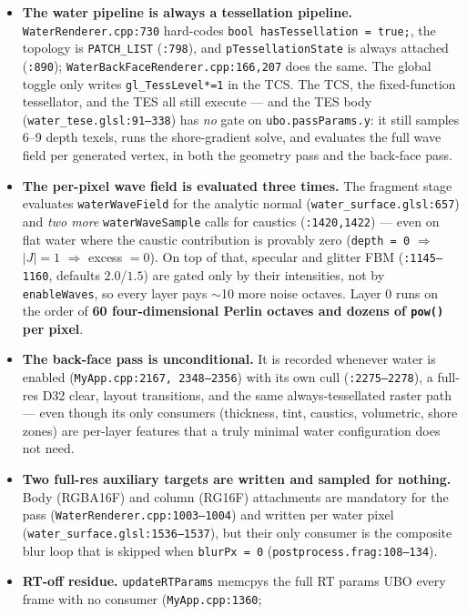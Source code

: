 \documentclass[11pt,a4paper]{article}
\begin{document}
\begin{itemize}
    \item \textbf{The water pipeline is always a tessellation pipeline.} \texttt{WaterRenderer.cpp:730} hard-codes \texttt{bool hasTessellation = true;}, the topology is
    \texttt{PATCH\_LIST} (\texttt{:798}), and \texttt{pTessellationState} is always attached (\texttt{:890}); \texttt{WaterBackFaceRenderer.cpp:166,207} does the same. The global
    toggle only writes \texttt{gl\_TessLevel*=1} in the TCS. The TCS, the fixed-function tessellator, and the TES all still execute --- and the TES body
    (\texttt{water\_tese.glsl:91--338}) has \emph{no} gate on \texttt{ubo.passParams.y}: it still samples 6--9 depth texels, runs the shore-gradient solve, and evaluates the full
    wave field per generated vertex, in both the geometry pass and the back-face pass.
    \item \textbf{The per-pixel wave field is evaluated three times.} The fragment stage evaluates \texttt{waterWaveField} for the analytic normal
    (\texttt{water\_surface.glsl:657}) and \emph{two more} \texttt{waterWaveSample} calls for caustics (\texttt{:1420,1422}) --- even on flat water where the caustic contribution is
    provably zero (\texttt{depth = 0} $\Rightarrow$ $|J| = 1$ $\Rightarrow$ excess $= 0$). On top of that, specular and glitter FBM (\texttt{:1145--1160}, defaults $2.0$/$1.5$) are gated
    only by their intensities, not by \texttt{enableWaves}, so every layer pays $\sim$10 more noise octaves. Layer 0 runs on the order of \textbf{60 four-dimensional Perlin
    octaves and dozens of \texttt{pow()} per pixel}.
    \item \textbf{The back-face pass is unconditional.} It is recorded whenever water is enabled (\texttt{MyApp.cpp:2167, 2348--2356}) with its own cull
    (\texttt{:2275--2278}), a full-res D32 clear, layout transitions, and the same always-tessellated raster path --- even though its only consumers (thickness, tint, caustics,
    volumetric, shore zones) are per-layer features that a truly minimal water configuration does not need.
    \item \textbf{Two full-res auxiliary targets are written and sampled for nothing.} Body (RGBA16F) and column (RG16F) attachments are mandatory for the pass
    (\texttt{WaterRenderer.cpp:1003--1004}) and written per water pixel (\texttt{water\_surface.glsl:1536--1537}), but their only consumer is the composite blur loop that is
    skipped when \texttt{blurPx = 0} (\texttt{postprocess.frag:108--134}).
    \item \textbf{RT-off residue.} \texttt{updateRTParams} memcpys the full RT params UBO every frame with no consumer (\texttt{MyApp.cpp:1360};

\end{itemize}
\end{document}
